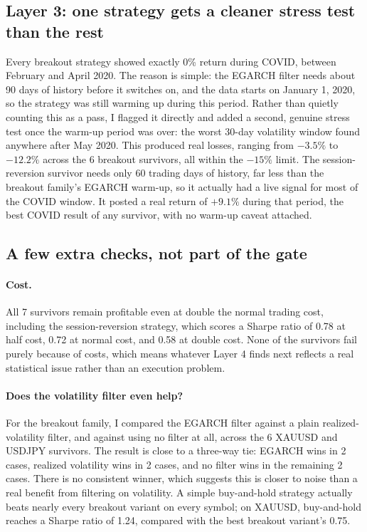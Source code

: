 \documentclass[11pt]{article}
\begin{document}
\subsection{Layer 3: one strategy gets a cleaner stress test than the rest}
Every breakout strategy showed exactly 0\% return during COVID, between February and April 2020. The reason is
simple: the EGARCH filter needs about 90 days of history before it switches on, and the data starts on January 1,
2020, so the strategy was still warming up during this period. Rather than quietly counting this as a pass, I
flagged it directly and added a second, genuine stress test once the warm-up period was over: the worst 30-day
volatility window found anywhere after May 2020. This produced real losses, ranging from $-3.5\%$ to $-12.2\%$
across the 6 breakout survivors, all within the $-15\%$ limit. The session-reversion survivor needs only 60 trading
days of history, far less than the breakout family's EGARCH warm-up, so it actually had a live signal for most of
the COVID window. It posted a real return of $+9.1\%$ during that period, the best COVID result of any survivor,
with no warm-up caveat attached.

\subsection{A few extra checks, not part of the gate}
\paragraph{Cost.} All 7 survivors remain profitable even at double the normal trading cost, including the
session-reversion strategy, which scores a Sharpe ratio of 0.78 at half cost, 0.72 at normal cost, and 0.58 at
double cost. None of the survivors fail purely because of costs, which means whatever Layer 4 finds next reflects a
real statistical issue rather than an execution problem.

\paragraph{Does the volatility filter even help?} For the breakout family, I compared the EGARCH filter against a
plain realized-volatility filter, and against using no filter at all, across the 6 XAUUSD and USDJPY survivors. The
result is close to a three-way tie: EGARCH wins in 2 cases, realized volatility wins in 2 cases, and no filter wins
in the remaining 2 cases. There is no consistent winner, which suggests this is closer to noise than a real benefit
from filtering on volatility. A simple buy-and-hold strategy actually beats nearly every breakout variant on every
symbol; on XAUUSD, buy-and-hold reaches a Sharpe ratio of 1.24, compared with the best breakout variant's 0.75.
\end{document}
